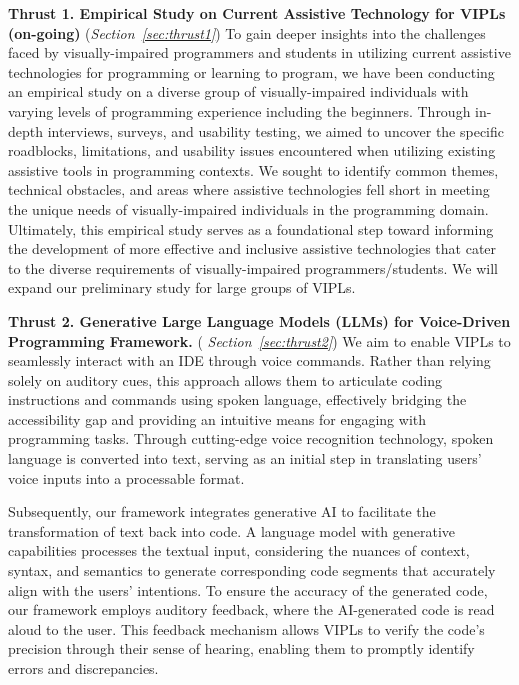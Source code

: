 \vspace{3pt}
\noindent \textbf{Thrust 1. Empirical Study on Current Assistive
  Technology for VIPLs (on-going)} ({\em Section~\ref{sec:thrust1}})
To gain deeper insights into the challenges faced by visually-impaired
programmers and students in utilizing current assistive technologies
for programming or learning to program, we have been conducting an
empirical study on a diverse group of visually-impaired individuals
with varying levels of programming experience including the
beginners. Through in-depth interviews, surveys, and usability
testing, we aimed to uncover the specific roadblocks, limitations, and
usability issues encountered when utilizing existing assistive tools
in programming contexts.
We sought to identify common themes, technical obstacles, and areas
where assistive technologies fell short in meeting the unique needs of
visually-impaired individuals in the programming domain. Ultimately,
this empirical study serves as a foundational step toward informing
the development of more effective and inclusive assistive technologies
that cater to the diverse requirements of visually-impaired
programmers/students. We will expand our preliminary study
for large groups of VIPLs.

\noindent \textbf{Thrust 2. Generative Large Language Models (LLMs)
  for Voice-Driven Programming Framework.}  ({\em
  Section~\ref{sec:thrust2}})
We aim to enable VIPLs to seamlessly interact with an IDE through
voice commands. Rather than relying solely on auditory cues, this
approach allows them to articulate coding instructions and commands
using spoken language, effectively bridging the accessibility gap and
providing an intuitive means for engaging with programming
tasks. Through cutting-edge voice recognition technology, spoken
language is converted into text, serving as an initial step in
translating users' voice inputs into a processable format.

Subsequently, our framework integrates generative AI to facilitate the
transformation of text back into code. A language model with
generative capabilities processes the textual input, considering the
nuances of context, syntax, and semantics to generate corresponding
code segments that accurately align with the users' intentions. To
ensure the accuracy of the generated code, our framework employs
auditory feedback, where the AI-generated code is read aloud to the
user. This feedback mechanism allows VIPLs to verify the code's
precision through their sense of hearing, enabling them to promptly
identify errors and discrepancies.

